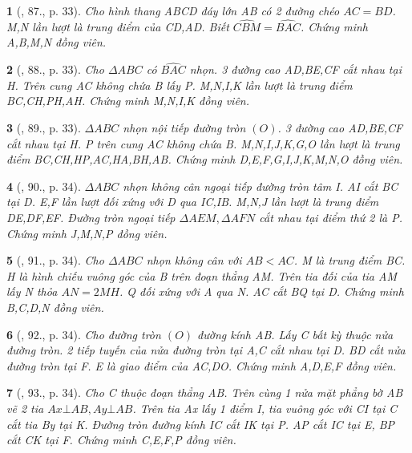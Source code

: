 \documentclass{article}
\newtheorem{baitoan}{}
\begin{document}
\begin{baitoan}[\cite{Thu_Chung_Viet_Minh_circ}, 87., p. 33]
	Cho hình thang ABCD đáy lớn AB có 2 đường chéo $AC = BD$. M,N lần lượt là trung điểm của CD,AD. Biết $\widehat{CBM} = \widehat{BAC}$. Chứng minh A,B,M,N đồng viên.
\end{baitoan}

\begin{baitoan}[\cite{Thu_Chung_Viet_Minh_circ}, 88., p. 33]
	Cho $\Delta ABC$ có $\widehat{BAC}$ nhọn. 3 đường cao AD,BE,CF cắt nhau tại H. Trên cung AC không chứa B lấy P. M,N,I,K lần lượt là trung điểm BC,CH,PH,AH. Chứng minh M,N,I,K đồng viên.
\end{baitoan}

\begin{baitoan}[\cite{Thu_Chung_Viet_Minh_circ}, 89., p. 33]
	$\Delta ABC$ nhọn nội tiếp đường tròn $(O)$. 3 đường cao AD,BE,CF cắt nhau tại H. P trên cung AC không chứa B. M,N,I,J,K,G,O lần lượt là trung điểm BC,CH,HP,AC,HA,BH,AB. Chứng minh D,E,F,G,I,J,K,M,N,O đồng viên.
\end{baitoan}

\begin{baitoan}[\cite{Thu_Chung_Viet_Minh_circ}, 90., p. 34]
	$\Delta ABC$ nhọn không cân ngoại tiếp đường tròn tâm I. AI cắt BC tại D. E,F lần lượt đối xứng với D qua IC,IB. M,N,J lần lượt là trung điểm DE,DF,EF. Đường tròn ngoại tiếp $\Delta AEM,\Delta AFN$ cắt nhau tại điểm thứ 2 là P. Chứng minh J,M,N,P đồng viên.
\end{baitoan}

\begin{baitoan}[\cite{Thu_Chung_Viet_Minh_circ}, 91., p. 34]
	Cho $\Delta ABC$ nhọn không cân với $AB < AC$. M là trung điểm BC. H là hình chiếu vuông góc của B trên đoạn thẳng AM. Trên tia đối của tia AM lấy N thỏa $AN = 2MH$. Q đối xứng với A qua N. AC cắt BQ tại D. Chứng minh B,C,D,N đồng viên.
\end{baitoan}

\begin{baitoan}[\cite{Thu_Chung_Viet_Minh_circ}, 92., p. 34]
	Cho đường tròn $(O)$ đường kính AB. Lấy C bất kỳ thuộc nửa đường tròn. 2 tiếp tuyến của nửa đường tròn tại A,C cắt nhau tại D. BD cắt nửa đường tròn tại F. E là giao điểm của AC,DO. Chứng minh A,D,E,F đồng viên.
\end{baitoan}

\begin{baitoan}[\cite{Thu_Chung_Viet_Minh_circ}, 93., p. 34]
	Cho C thuộc đoạn thẳng AB. Trên cùng 1 nửa mặt phẳng bờ AB vẽ 2 tia $Ax\bot AB,Ay\bot AB$. Trên tia Ax lấy 1 điểm I, tia vuông góc với CI tại C cắt tia By tại K. Đường tròn đường kính IC cắt IK tại P. AP cắt IC tại E, BP cắt CK tại F. Chứng minh C,E,F,P đồng viên.
\end{baitoan}
\end{document}
